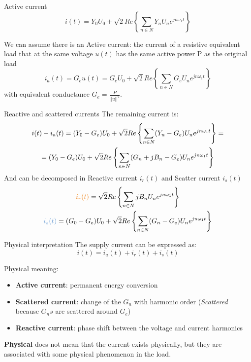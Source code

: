 \documentclass[aspectratio=169]{beamer}
\begin{document}
  \begin{frame}{Active current}{\insertsection}
    \begin{equation}
      i(t) = Y_0U_0 + \sqrt{2}Re\left\{\sum_{n\in N}Y_n U_n e^{jn\omega_1t}\right\}
    \end{equation}

  We can assume there is an \textcolor{NTNU_orange}{Active current}: the current of a resistive equivalent load that at the same voltage $u(t)$ has the same active power P as the original load
  \begin{equation}
    i_a(t) = G_e u(t) = G_e U_0 + \sqrt{2}Re\left\{\sum_{n\in N}G_e U_n e^{jn\omega_1t}\right\} 
  \end{equation}
  with \textcolor{NTNU_orange}{equivalent conductance} $G_e = \frac{P}{||u||^2}$.

  \end{frame}

  \begin{frame}{Reactive and scattered currents}{\insertsection}
  The remaining current is:
  \begin{gather}
    i(t)-i_a(t) = (Y_0-G_e)U_0 + \sqrt{2}Re\left\{\sum_{n\in N}(Y_n-G_e)U_n e^{jn\omega_1t}\right\}=\notag \\
    = (Y_0-G_e)U_0 + \sqrt{2}Re\left\{\sum_{n\in N}(G_n+jB_n-G_e)U_n e^{jn\omega_1t}\right\}
  \end{gather}
  And can be decomposed in \textcolor{NTNU_orange}{Reactive current} $i_r(t)$ and  \textcolor{NTNU_blue}{Scatter current} $i_s(t)$
  \begin{gather}
    \textcolor{NTNU_orange}{i_r(t)} = \sqrt{2} Re\left\{\sum_{n\in N}j B_n U_n e^{jn\omega_1t}\right\}\\
    \textcolor{NTNU_blue}{i_s(t)} = (G_0-G_e)U_0 + \sqrt{2}Re\left\{\sum_{n\in N}(G_n-G_e)U_n e^{jn\omega_1t}\right\}
  \end{gather}

  \end{frame}

  \begin{frame}{Physical interpretation}{\insertsection}
  The supply current can be expressed as:
    \begin{equation}
      i(t) = i_a(t) + i_r(t) + i_s(t)
    \end{equation}

    Physical meaning:
    \begin{itemize}
      \item \textbf{Active current}: permanent energy conversion
      \item \textbf{Scattered current}: change of the $G_n$ with harmonic order (\textit{Scattered} because $G_ns$ are scattered around $G_e$)
      \item \textbf{Reactive current}: phase shift between the voltage and current harmonics
    \end{itemize}

    \textbf{\textcolor{NTNU_blue}{Physical}} does not mean that the current exists physically, but they are associated with some physical phenomenon in the load. 
  \end{frame}
\end{document}
